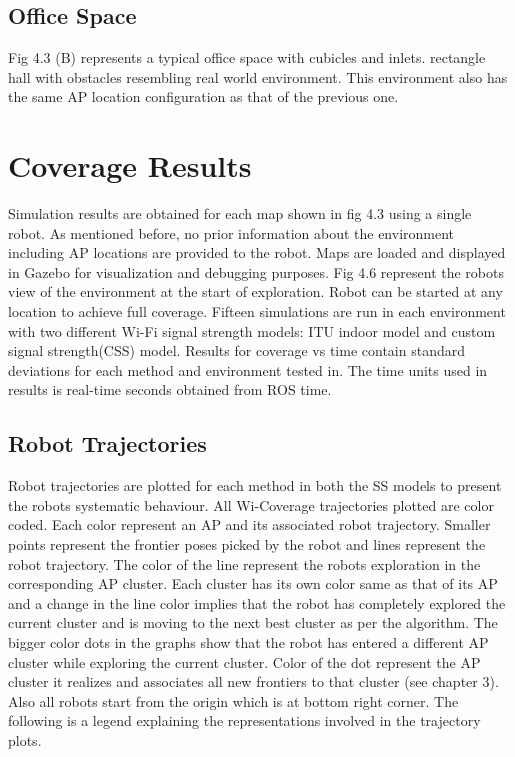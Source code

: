 \subsection{Office Space}
Fig 4.3 (B) represents a typical office space with cubicles and inlets. rectangle hall with obstacles resembling real world environment. This environment also has the same AP location configuration as that of the previous one.

\section{Coverage Results}
Simulation results are obtained for each map shown in fig 4.3 using a single robot. As mentioned before, no prior information about the environment including AP locations are provided to the robot. Maps are loaded and displayed in Gazebo for visualization and debugging purposes. Fig 4.6 represent the robots view of the environment at the start of exploration. Robot can be started at any location to achieve full coverage. Fifteen simulations are run in each environment with two different Wi-Fi signal strength models: ITU indoor model and custom signal strength(CSS) model. Results for coverage vs time contain standard deviations for each method and environment tested in. The time units used in results is real-time seconds obtained from ROS time.

\subsection{Robot Trajectories}
Robot trajectories are plotted for each method in both the SS models to present the robots systematic behaviour. All Wi-Coverage trajectories plotted are color coded. Each color represent an AP and its associated robot trajectory. Smaller points represent the frontier poses picked by the robot and lines represent the robot trajectory. The color of the line represent the robots exploration in the corresponding AP cluster. Each cluster has its own color same as that of its AP and a change in the line color implies that the robot has completely explored the current cluster and is moving to the next best cluster as per the algorithm. The bigger color dots in the graphs show that the robot has entered a different AP cluster while exploring the current cluster. Color of the dot represent the AP cluster it realizes and associates all new frontiers to that cluster (see chapter 3). Also all robots start from the origin which is at bottom right corner. The following is a legend explaining the representations involved in the trajectory plots.

